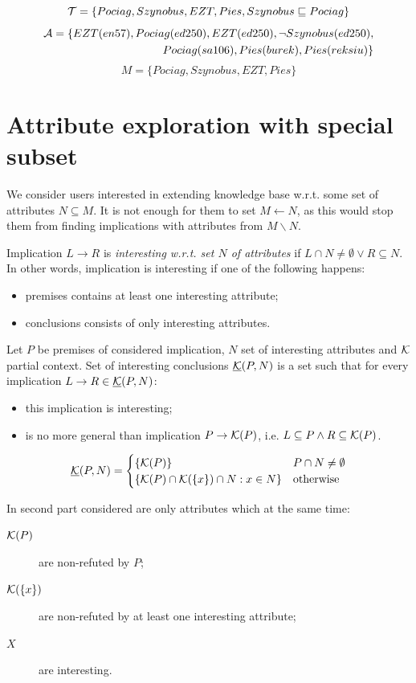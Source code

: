 \documentclass{llncs}
\newcommand{\pc}{\ensuremath\mathcal{K}}
\newcommand{\tbox}{\ensuremath\mathcal{T}}
\newcommand{\abox}{\ensuremath\mathcal{A}}
\newcommand{\soc}{\ensuremath\underline{\pc}}
\begin{document}
\begin{example}
\[ \tbox=\{Pociag, Szynobus, EZT, Pies, Szynobus\sqsubseteq Pociag \} \]
\begin{align*}
\abox=\{EZT(en57), Pociag(ed250), EZT(ed250), \lnot Szynobus(ed250),\\ Pociag(sa106), Pies(burek), Pies(reksiu) \}
\end{align*}
\[ M=\{Pociag, Szynobus, EZT, Pies\} \]
\end{example}

\section{Attribute exploration with special subset}

We consider users interested in extending knowledge base w.r.t. some set of
attributes $N\subseteq M$. It is not enough for them to set $M\leftarrow N$, as
this would stop them from finding implications with attributes from
$M\backslash N$.

\begin{definition}
Implication $L\to R$ is \emph{interesting w.r.t. set $N$ of attributes} if $L\cap N\neq\emptyset \lor R\subseteq N$. In other words, implication is interesting if one of the following happens:
\begin{itemize}
\item premises contains at least one interesting attribute;
\item conclusions consists of only interesting attributes.
\end{itemize}
\end{definition}

\begin{definition}
Let $P$ be premises of considered implication, $N$ set of interesting attributes and $\pc$ partial context. Set of interesting conclusions $\soc(P,N)$ is a set such that for every implication $L\to R\in\soc(P,N)$:
\begin{itemize}
\item this implication is interesting;
\item is no more general than implication $P\to\pc(P)$, i.e. $L\subseteq P \land R\subseteq \pc(P)$.
\end{itemize}
\[ \soc(P,N)=\begin{cases}
\{\pc(P)\} & P\cap N\neq\emptyset \\
\{\pc(P)\cap\pc(\{x\})\cap N : x\in N \} & \text{otherwise}
\end{cases} \]

In second part considered are only attributes which at the same time:
\begin{description}
\item[$\pc(P)$] are non-refuted by $P$;
\item[$\pc(\{x\})$] are non-refuted by at least one interesting attribute; 
\item[$X$] are interesting.
\end{description}
\end{definition}
\end{document}
